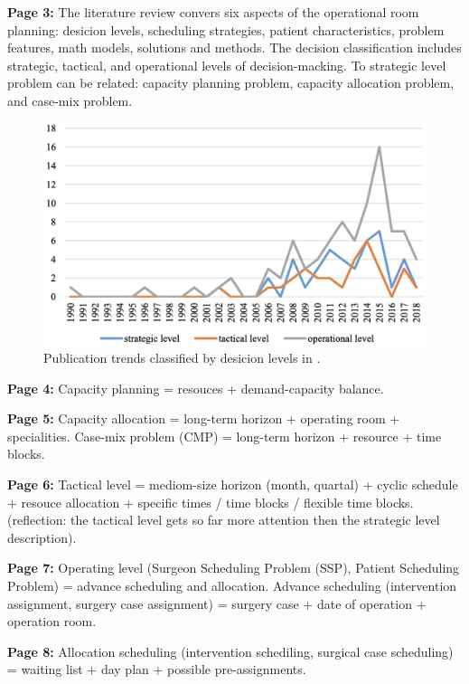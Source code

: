     \textbf{Page 3:}
    The literature review convers six aspects of the operational room planning: desicion levels, scheduling strategies, patient characteristics, problem features, math models, solutions and methods. The decision classification includes strategic, tactical, and operational levels of decision-macking. To strategic level problem can be related: capacity planning problem, capacity allocation problem, and case-mix problem.
    \begin{figure}[H]
        \centering
        \includegraphics[width=1\textwidth]{figures/SR0013CN19/fig2.png}
        \caption{Publication trends classified by desicion levels in \cite{x203}.}
        \label{fig2:SR0013CN19}
    \end{figure}

    \textbf{Page 4:}
    Capacity planning = resouces + demand-capacity balance.
    
    \textbf{Page 5:}
    Capacity allocation = long-term horizon + operating room + specialities.
    Case-mix problem (CMP) = long-term horizon + resource  + time blocks.
    
    \textbf{Page 6:}
    Tactical level = mediom-size horizon (month, quartal) + cyclic schedule + resouce allocation + specific times / time blocks / flexible time blocks. (reflection: the tactical level gets so far more attention then the strategic level description).
    
    \textbf{Page 7:}
    Operating level (Surgeon Scheduling Problem (SSP), Patient Scheduling Problem) = advance scheduling and allocation. Advance scheduling (intervention assignment, surgery case assignment) = surgery case + date of operation + operation room. 
    
    \textbf{Page 8:}
    Allocation scheduling (intervention schediling, surgical case scheduling) = waiting list + day plan + possible pre-assignments.   
    
